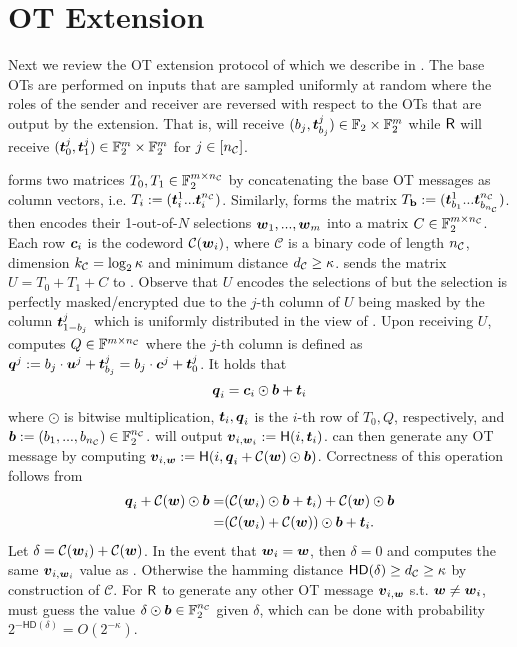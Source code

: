 


\section{OT Extension} \label{sec:otext}


Next we review the OT extension protocol of \cite{C:KelOrsSch15,RSA:OrrOrsSch17} which we describe in . The base OTs are performed on inputs that are sampled uniformly at random where the roles of the sender and receiver are reversed with respect to the OTs that are output by the extension. That is, \send will receive $(b_j, \tt^j_{b_j})\in\mathbb{F}_2\times \mathbb{F}_2^m$ while $\rec$ will receive $(\tt^j_0,\tt^j_1)\in\mathbb{F}_2^m\times \mathbb{F}_2^m$ for $j\in[\nc]$.

\rec forms two matrices $T_0,T_1\in \mathbb{F}_2^{m\times \nc}$ by concatenating the base OT messages as column vectors, i.e. $T_i:=(\tt^1_i ... \tt^\nc_i)$. Similarly, \send forms the matrix $T_{\text{\textbf{b}}}:=(\tt^1_{b_1}...\tt^\nc_{b_\nc})$. \rec then encodes their 1-out-of-$N$ selections $\ww_1,...,\ww_m$ into a matrix $C\in \mathbb{F}_2^{m\times \nc}$. Each row $\cc_i$ is the codeword $\mathcal{C}(\ww_i)$, where $\mathcal{C}$ is a binary code of length $\nc$, dimension $\kc=\log_2\kappa$ and minimum distance $\dc\geq\kappa$. \rec sends the matrix $U=T_0+T_1+C$
to \send. Observe that $U$ encodes the selections of \rec but the selection is perfectly masked/encrypted due to the $j$-th column of $U$ being masked by the column $\tt^j_{1-b_j}$ which is uniformly distributed in the view of \send. Upon receiving $U$, \send computes $Q\in\mathbb{F}^{m\times\nc}$ where the $j$-th column is defined as $\qq^j:=b_j\cdot \uu^j+\tt^j_{b_j}=b_j\cdot \cc^j+\tt^j_0$. It holds that 
$$
	\qq_i=\cc_i\odot \bb + \tt_i
$$
where $\odot$ is bitwise multiplication, $\tt_i,\qq_i$ is the $i$-th row of $T_0,Q$, respectively, and $\bb:=(b_1,...,b_\nc)\in \mathbb{F}^\nc_2$. \rec will output $\vv_{i,\ww_i}:=\H(i, \tt_i)$. \send can then generate any OT message by computing $\vv_{i,\ww}:=\H(i, \qq_i + \mathcal{C}(\ww)\odot \bb)$. Correctness of this operation follows from 
\begin{align*}
	\qq_i + \mathcal{C}(\ww)\odot \bb =&  (\mathcal{C}(\ww_i)\odot \bb + \tt_i) + \mathcal{C}(\ww)\odot \bb\\
	=& (\mathcal{C}(\ww_i) + \mathcal{C}(\ww)) \odot \bb +\tt_i.
\end{align*}
Let $\delta = \mathcal{C}(\ww_i) + \mathcal{C}(\ww)$. In the event that $\ww_i=\ww$, then $\delta=0$ and \send computes the same $\vv_{i,\ww_i}$ value as \rec. Otherwise the hamming distance $\textsf{HD}(\delta)\geq \dc\geq \kappa$ by construction of $\mathcal{C}$. For $\rec$ to generate any other OT message $\vv_{i,\ww}$ s.t. $\ww\neq \ww_i$, \rec must guess the value $\delta\odot \bb\in \mathbb{F}^\nc_2$ given $\delta$, which can be done with probability $2^{-\textsf{HD}(\delta)}=O(2^{-\kappa})$.

